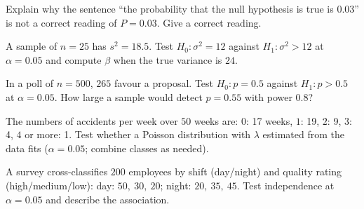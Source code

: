 \begin{exercise}
Explain why the sentence ``the probability that the null hypothesis is true is $0.03$'' is not a correct reading of $P=0.03$. Give a correct reading.
\end{exercise}

\begin{exercise}
A sample of $n=25$ has $s^2=18.5$. Test $H_0:\sigma^2=12$ against $H_1:\sigma^2>12$ at $\alpha=0.05$ and compute $\beta$ when the true variance is $24$.
\end{exercise}

\begin{exercise}
In a poll of $n=500$, $265$ favour a proposal. Test $H_0:p=0.5$ against $H_1:p>0.5$ at $\alpha=0.05$. How large a sample would detect $p=0.55$ with power $0.8$?
\end{exercise}

\begin{exercise}
The numbers of accidents per week over $50$ weeks are: $0$: 17 weeks, $1$: 19, $2$: 9, $3$: 4, $4$ or more: 1. Test whether a Poisson distribution with $\lambda$ estimated from the data fits ($\alpha=0.05$; combine classes as needed).
\end{exercise}

\begin{exercise}
A survey cross-classifies $200$ employees by shift (day/night) and quality rating (high/medium/low): day: $50,\ 30,\ 20$; night: $20,\ 35,\ 45$. Test independence at $\alpha=0.05$ and describe the association.
\end{exercise}
